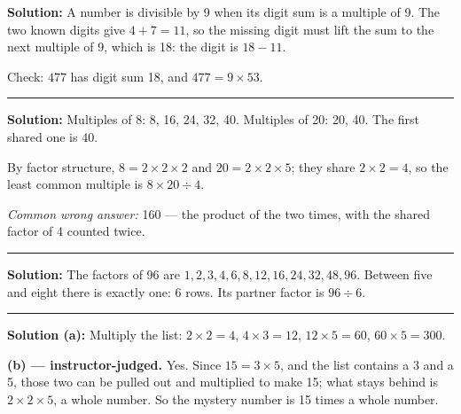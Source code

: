 \documentclass[12pt]{article}
\begin{document}
\textbf{Solution:} A number is divisible by 9 when its digit sum is a multiple of 9. The two known digits give $4 + 7 = 11$, so the missing digit must lift the sum to the next multiple of 9, which is 18: the digit is $18 - 11$. 

Check: $477$ has digit sum 18, and $477 = 9 \times 53$.

\vspace{0.15cm}\noindent\rule{\linewidth}{0.2pt}\vspace{0.15cm}


\textbf{Solution:} Multiples of 8: 8, 16, 24, 32, 40. Multiples of 20: 20, 40. The first shared one is 40.

By factor structure, $8 = 2 \times 2 \times 2$ and $20 = 2 \times 2 \times 5$; they share $2 \times 2 = 4$, so the least common multiple is $8 \times 20 \div 4$. 

\emph{Common wrong answer:} 160 --- the product of the two times, with the shared factor of 4 counted twice.

\vspace{0.15cm}\noindent\rule{\linewidth}{0.2pt}\vspace{0.15cm}


\textbf{Solution:} The factors of 96 are $1, 2, 3, 4, 6, 8, 12, 16, 24, 32, 48, 96$. Between five and eight there is exactly one: 6 rows. Its partner factor is $96 \div 6$. 

\vspace{0.15cm}\noindent\rule{\linewidth}{0.2pt}\vspace{0.15cm}


\textbf{Solution (a):} Multiply the list: $2 \times 2 = 4$, $4 \times 3 = 12$, $12 \times 5 = 60$, $60 \times 5 = 300$. 

\textbf{(b) --- instructor-judged.} Yes. Since $15 = 3 \times 5$, and the list contains a 3 and a 5, those two can be pulled out and multiplied to make 15; what stays behind is $2 \times 2 \times 5$, a whole number. So the mystery number is 15 times a whole number.
\end{document}
